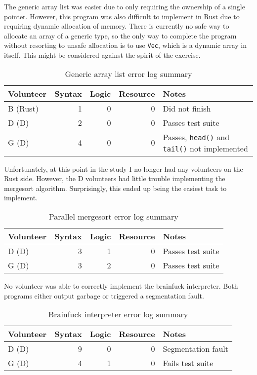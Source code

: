 \documentclass[finalcopy]{srpaper}
\begin{document}
The generic array list was easier due to only requiring the ownership of a
single pointer. However, this program was also difficult to implement in Rust
due to requiring dynamic allocation of memory. There is currently no safe way
to allocate an array of a generic type, so the only way to complete the program
without resorting to unsafe allocation is to use \texttt{Vec}, which is a
dynamic array in itself. This might be considered against the spirit of the
exercise.

\begin{table}[h]
\centering
\begin{tabular}{lrrrp{5cm}}
\toprule
Volunteer & Syntax & Logic & Resource & Notes \\
\midrule
B (Rust) & 1 & 0 & 0 & Did not finish \\
D (D) & 2 & 0 & 0 & Passes test suite \\
G (D) & 4 & 0 & 0 & Passes, \texttt{head()} and \texttt{tail()} not implemented \\
\bottomrule
\end{tabular}
\caption{Generic array list error log summary}
\label{tab:genericarraylist}
\end{table}

Unfortunately, at this point in the study I no longer had any volunteers on
the Rust side. However, the D volunteers had little trouble implementing the
mergesort algorithm. Surprisingly, this ended up being the easiest task to
implement.

\begin{table}[h]
\centering
\begin{tabular}{lrrrp{5cm}}
\toprule
Volunteer & Syntax & Logic & Resource & Notes \\
\midrule
D (D) & 3 & 1 & 0 & Passes test suite \\
G (D) & 3 & 2 & 0 & Passes test suite \\
\bottomrule
\end{tabular}
\caption{Parallel mergesort error log summary}
\label{tab:parallelmergesort}
\end{table}

No volunteer was able to correctly implement the brainfuck interpreter. Both
programs either output garbage or triggered a segmentation fault.

\begin{table}[h]
\centering
\begin{tabular}{lrrrp{5cm}}
\toprule
Volunteer & Syntax & Logic & Resource & Notes \\
\midrule
D (D) & 9 & 0 & 0 & Segmentation fault \\
G (D) & 4 & 1 & 0 & Fails test suite \\
\bottomrule
\end{tabular}
\caption{Brainfuck interpreter error log summary}
\label{tab:brainfuckinterpreter}
\end{table}
\end{document}
